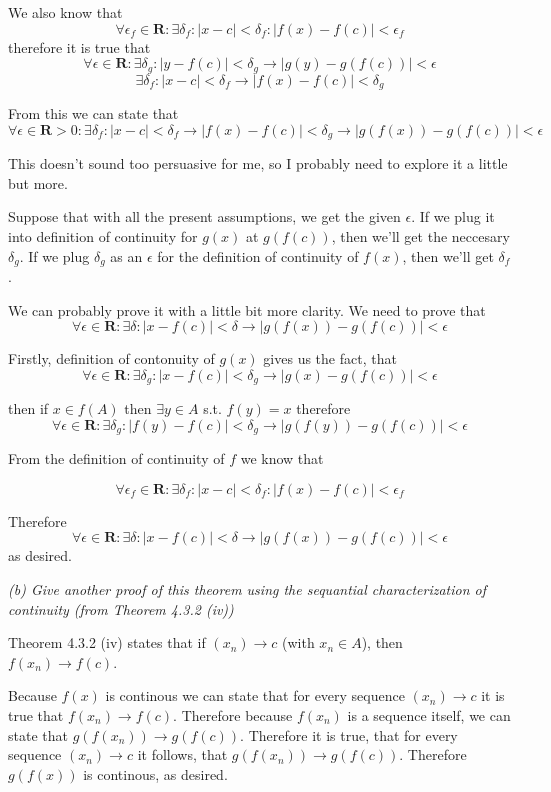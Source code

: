 \documentclass[11pt,oneside,titlepage]{article}
\begin{document}
We also know that
$$ \forall \epsilon_f \in \textbf{R}: \exists \delta_f: |x - c | < \delta_f:
|f(x) - f(c)| < \epsilon_f$$
therefore it is true that
$$ \forall \epsilon \in \textbf{R}: \exists \delta_g: |y - f(c)| < \delta_g
\to |g(y) - g(f(c))| < \epsilon $$
$$ \exists \delta_f: |x - c | < \delta_f \to
|f(x) - f(c)| < \delta_g$$

From this we can state that
$$ \forall \epsilon \in \textbf{R} > 0: \exists \delta_f: |x - c | < \delta_f \to |f(x) - f(c)| < \delta_g \to
|g(f(x)) - g(f(c))| < \epsilon $$

This doesn't sound too persuasive for me, so I probably need to explore it a
little but more.

Suppose that with all the present assumptions, we get the given $\epsilon$.
If we plug it into definition of continuity for  $g(x)$ at $g(f(c))$, then
we'll get the neccesary $\delta_g$. If we plug $\delta_g$ as an $\epsilon$
for the definition of continuity of $f(x)$, then we'll get $\delta_f$.

We can probably prove it with a little bit more clarity. We need to prove that
$$\forall \epsilon \in \textbf{R}: \exists \delta: |x - f(c)| < \delta \to
|g(f(x)) - g (f(c))| < \epsilon$$

Firstly, definition of contonuity of $g(x)$ gives us the fact, that 
$$ \forall \epsilon \in \textbf{R}: \exists \delta_g: |x - f(c)| < \delta_g
\to |g(x) - g(f(c))| < \epsilon $$

then if $x \in f(A)$ then $\exists y \in A $ s.t. $f(y) = x$ therefore
$$ \forall \epsilon \in \textbf{R}: \exists \delta_g: |f(y) - f(c)| < \delta_g
\to |g(f(y)) - g(f(c))| < \epsilon $$

From the definition of continuity of $f$ we know that 

$$ \forall \epsilon_f \in \textbf{R}: \exists \delta_f: |x - c | < \delta_f:
|f(x) - f(c)| < \epsilon_f$$

Therefore 
$$\forall \epsilon \in \textbf{R}: \exists \delta: |x - f(c)| < \delta \to
|g(f(x)) - g (f(c))| < \epsilon$$
as desired.

\textit{(b) Give another proof of this theorem using the sequantial
  characterization of continuity (from Theorem 4.3.2 (iv)) }

Theorem 4.3.2 (iv) states that if $(x_n) \to c$ (with $x_n \in A$), then
$f(x_n) \to f(c)$.

Because $f(x)$ is continous we can state that for every sequence $(x_n) \to c$
it is true that $f(x_n) \to f(c)$. Therefore because $f(x_n)$ is a sequence
itself, we can state that $g(f(x_n)) \to g(f(c))$. Therefore it is true, that
for every sequence $(x_n) \to c$ it follows, that $g(f(x_n)) \to g(f(c))$.
Therefore $g(f(x))$ is continous, as desired.
\end{document}

